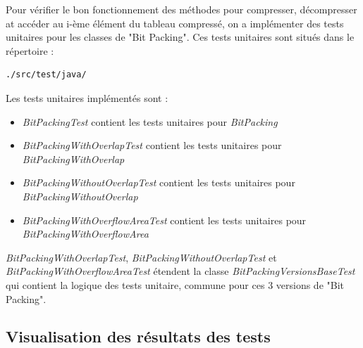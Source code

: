 \documentclass[titlepage]{article}
\begin{document}
Pour vérifier le bon fonctionnement des méthodes pour compresser, décompresser at accéder au i-ème élément du tableau compressé, on a implémenter des tests unitaires pour les classes de "Bit Packing". Ces tests unitaires sont situés dans le répertoire :
\begin{lstlisting}
./src/test/java/
\end{lstlisting}
\par Les tests unitaires implémentés sont :
\begin{itemize}
\item \textsl{BitPackingTest} contient les tests unitaires pour \textsl{BitPacking}
\item \textsl{BitPackingWithOverlapTest} contient les tests unitaires pour \textsl{BitPackingWithOverlap}
\item \textsl{BitPackingWithoutOverlapTest} contient les tests unitaires pour \textsl{BitPackingWithoutOverlap}
\item \textsl{BitPackingWithOverflowAreaTest} contient les tests unitaires pour \textsl{BitPackingWithOverflowArea}
\end{itemize}
\par \textsl{BitPackingWithOverlapTest}, \textsl{BitPackingWithoutOverlapTest} et \textsl{BitPackingWithOverflowAreaTest} étendent la classe \textsl{BitPackingVersionsBaseTest} qui contient la logique des tests unitaire, commune pour ces 3 versions de "Bit Packing".

\subsection{Visualisation des résultats des tests}
\end{document}
